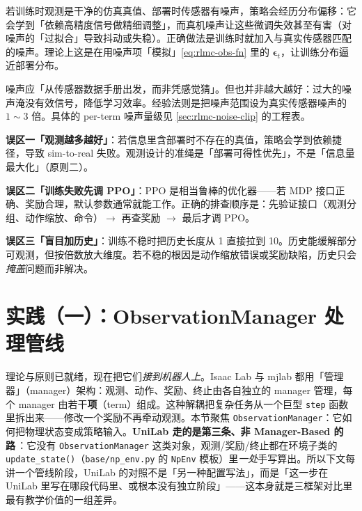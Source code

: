 若训练时观测是干净的仿真真值、部署时传感器有噪声，策略会经历分布偏移：它会学到「依赖高精度信号做精细调整」，而真机噪声让这些微调失效甚至有害（对噪声的「过拟合」导致抖动或失稳）。正确做法是训练时就加入与真实传感器匹配的噪声。理论上这是在用噪声项「模拟」\cref{eq:rlmc-obs-fn} 里的 $\boldsymbol\epsilon_t$，让训练分布逼近部署分布。

噪声应「从传感器数据手册出发，而非凭感觉猜」。但也并非越大越好：过大的噪声淹没有效信号，降低学习效率。经验法则是把噪声范围设为真实传感器噪声的 $1\!\sim\!3$ 倍。具体的 per-term 噪声量级见 \cref{sec:rlmc-noise-clip} 的工程表。

\begin{pitfall}[三个常见认知误区]
\textbf{误区一「观测越多越好」}：若信息里含部署时不存在的真值，策略会学到依赖捷径，导致 sim-to-real 失败。观测设计的准绳是「部署可得性优先」，不是「信息量最大化」（原则二）。

\textbf{误区二「训练失败先调 PPO」}：PPO 是相当鲁棒的优化器——若 MDP 接口正确、奖励合理，默认参数通常就能工作。正确的排查顺序是：先验证接口（观测分组、动作缩放、命令）$\to$ 再查奖励 $\to$ 最后才调 PPO。

\textbf{误区三「盲目加历史」}：训练不稳时把历史长度从 1 直接拉到 10。历史能缓解部分可观测，但按倍数放大维度。若不稳的根因是动作缩放错误或奖励缺陷，历史只会\emph{掩盖}问题而非解决。
\end{pitfall}

\section{实践（一）：ObservationManager 处理管线}
\label{sec:rlmc-pipeline}

理论与原则已就绪，现在把它们\emph{接到机器人上}。Isaac Lab 与 mjlab 都用「管理器」（manager）架构：观测、动作、奖励、终止由各自独立的 manager 管理，每个 manager 由若干\textbf{项}（term）组成。这种解耦把复杂任务从一个巨型 \verb|step| 函数里拆出来——修改一个奖励不再牵动观测。本节聚焦 \verb|ObservationManager|：它如何把物理状态变成策略输入。\textbf{UniLab 走的是第三条、非 Manager-Based 的路}\,\cite{unilab2026}：它没有 \verb|ObservationManager| 这类对象，观测/奖励/终止都在环境子类的 \verb|update_state()|（\verb|base/np_env.py| 的 \verb|NpEnv| 模板）里\emph{一处}手写算出。所以下文每讲一个管线阶段，UniLab 的对照不是「另一种配置写法」，而是「这一步在 UniLab 里写在哪段代码里、或根本没有独立阶段」——这本身就是三框架对比里最有教学价值的一组差异。

